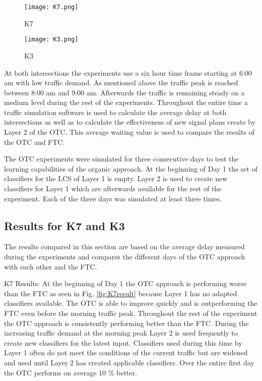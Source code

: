 \begin{figure} [!htb]
	\centering
	\texttt{[image: K7.png]}
	\caption{K7 \cite{organic1}}
	\label{fig:K7}
\end{figure}

\begin{figure} [!htb]
	\centering
	\texttt{[image: K3.png]}
	\caption{K3 \cite{organic1}}
	\label{fig:K3}
\end{figure}

At both intersections the experiments use a six hour time frame starting at 6:00 am with low traffic demand. As mentioned above the traffic peak is reached between 8:00 am and 9:00 am. Afterwards the traffic is remaining steady on a medium level during the rest of the experiments. Throughout the entire time a traffic simulation software is used to calculate the average delay at both intersections as well as to calculate the effectiveness of new signal plans create by Layer 2 of the OTC. This average waiting value is used to compare the results of the OTC and FTC.\cite{organic1}

The OTC experiments were simulated for three consecutive days to test the learning capabilities of the organic approach. At the beginning of Day 1 the set of classifiers for the LCS of Layer 1 is empty. Layer 2 is used to create new classifiers for Layer 1 which are afterwards available for the rest of the experiment. Each of the three days was simulated at least three times.\cite{organic1}


\subsection{Results for K7 and K3}
The results compared in this section are based on the average delay measured during the experiments and compares the different days of the OTC approach with each other and the FTC.

K7 Results: At the beginning of Day 1 the OTC approach is performing worse than the FTC as seen in Fig. \ref{fig:K7result} because Layer 1 has no adapted classifiers available. The OTC is able to improve quickly and is outperforming the FTC even before the morning traffic peak. Throughout the rest of the experiment the OTC approach is consistently performing better than the FTC. During the increasing traffic demand at the morning peak Layer 2 is used frequently to create new classifiers for the latest input. Classifiers used during this time by Layer 1 often do not meet the conditions of the current traffic but are widened and used until Layer 2 has created applicable classifiers. Over the entire first day the OTC performs on average 10 \% better.\cite{organic1}

